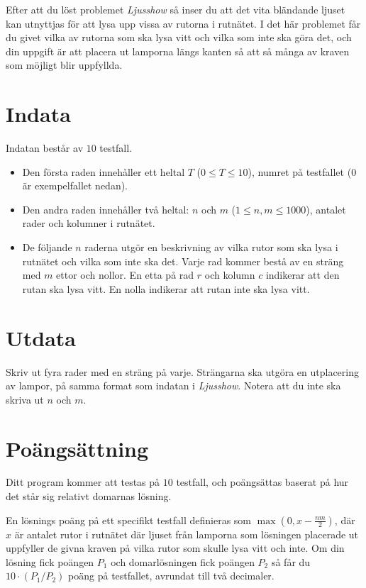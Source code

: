 
Efter att du löst problemet \textit{Ljusshow} så inser du att det vita bländande ljuset kan
utnyttjas för att lysa upp vissa av rutorna i rutnätet. I det här problemet får du givet vilka av
rutorna som ska lysa vitt och vilka som inte ska göra det, och din uppgift är att placera ut lamporna
längs kanten så att så många av kraven som möjligt blir uppfyllda.


\section*{Indata}
Indatan består av $10$ testfall.

\begin{itemize}
  \item 
    Den första raden innehåller ett heltal $T$ ($0 \leq T \leq 10$), numret på testfallet ($0$ är exempelfallet nedan).
  \item
    Den andra raden innehåller två heltal: $n$ och $m$ ($1 \le n,m \le 1000$), antalet rader och kolumner i rutnätet.
  \item

    De följande $n$ raderna utgör en beskrivning av vilka rutor som ska lysa i rutnätet och vilka som inte ska det.
    Varje rad kommer bestå av en sträng med $m$ ettor och nollor. En etta på rad $r$ och kolumn $c$ indikerar att den
    rutan ska lysa vitt. En nolla indikerar att rutan inte ska lysa vitt.

\end{itemize}

\section*{Utdata}
Skriv ut fyra rader med en sträng på varje. Strängarna ska utgöra en utplacering av lampor, på samma format
som indatan i \textit{Ljusshow}. Notera att du inte ska skriva ut $n$ och $m$.

\section*{Poängsättning}
Ditt program kommer att testas på $10$ testfall, och poängsättas baserat på hur det står sig relativt domarnas lösning.

En lösnings poäng på ett specifikt testfall definieras som $\max(0, x - \frac{nm}{2})$, där $x$ är 
antalet rutor i rutnätet där ljuset från lamporna som lösningen placerade ut uppfyller de givna kraven
på vilka rutor som skulle lysa vitt och inte. Om din lösning fick poängen $P_1$ och domarlösningen fick
poängen $P_2$ så får du $10 \cdot (P_1 / P_2)$ poäng på testfallet, avrundat till två decimaler.


